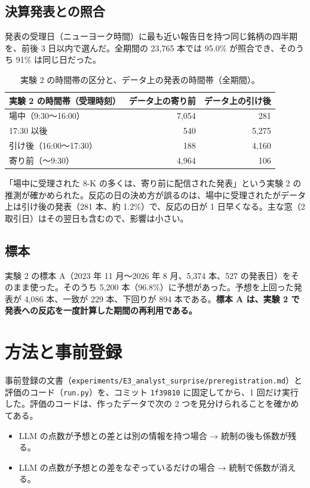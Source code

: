 \documentclass[xelatex,ja=standard,jafont=haranoaji,a4paper,10pt,openany]{bxjsreport}
\newcommand{\code}[1]{\texttt{#1}}
\begin{document}
\section{決算発表との照合}

発表の受理日（ニューヨーク時間）に最も近い報告日を持つ同じ銘柄の四半期を、前後 3 日以内で選んだ。全期間の 23,765 本では 95.0\% が照合でき、そのうち 91\% は同じ日だった。

\begin{table}[H]
\centering
\caption{実験 2 の時間帯の区分と、データ上の発表の時間帯（全期間）。}
\small
\begin{tabular}{lrr}
\toprule
実験 2 の時間帯（受理時刻） & データ上の寄り前 & データ上の引け後 \\
\midrule
場中（9:30〜16:00） & 7,054 & 281 \\
17:30 以後 & 540 & 5,275 \\
引け後（16:00〜17:30） & 188 & 4,160 \\
寄り前（〜9:30） & 4,964 & 106 \\
\bottomrule
\end{tabular}
\end{table}

「場中に受理された 8-K の多くは、寄り前に配信された発表」という実験 2 の推測が確かめられた。反応の日の決め方が誤るのは、場中に受理されたがデータ上は引け後の発表（281 本、約 1.2\%）で、反応の日が 1 日早くなる。主な窓（2 取引日）はその翌日も含むので、影響は小さい。

\section{標本}

実験 2 の標本 A（2023 年 11 月〜2026 年 8 月、5,374 本、527 の発表日）をそのまま使った。そのうち 5,200 本（96.8\%）に予想があった。予想を上回った発表が 4,086 本、一致が 229 本、下回りが 894 本である。\textbf{標本 A は、実験 2 で発表への反応を一度計算した期間の再利用である。}

\chapter{方法と事前登録}\label{ch:method}

事前登録の文書（\code{experiments/E3\_analyst\_surprise/preregistration.md}）と評価のコード（\code{run.py}）を、コミット \code{1f39810} に固定してから、1 回だけ実行した。評価のコードは、作ったデータで次の 2 つを見分けられることを確かめてある。
\begin{itemize}
\item LLM の点数が予想との差とは別の情報を持つ場合 → 統制の後も係数が残る。
\item LLM の点数が予想との差をなぞっているだけの場合 → 統制で係数が消える。
\end{itemize}
\end{document}
